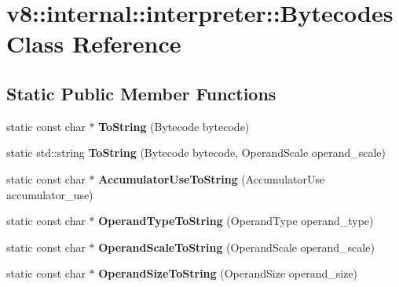 \hypertarget{classv8_1_1internal_1_1interpreter_1_1_bytecodes}{}\section{v8\+:\+:internal\+:\+:interpreter\+:\+:Bytecodes Class Reference}
\label{classv8_1_1internal_1_1interpreter_1_1_bytecodes}
\subsection*{Static Public Member Functions}
\begin{DoxyCompactItemize}
\item 
static const char $\ast$ {\bfseries To\+String} (Bytecode bytecode)\hypertarget{classv8_1_1internal_1_1interpreter_1_1_bytecodes_ae3e76b6c1aba4e2cfafd4c53594607ba}{}\label{classv8_1_1internal_1_1interpreter_1_1_bytecodes_ae3e76b6c1aba4e2cfafd4c53594607ba}

\item 
static std\+::string {\bfseries To\+String} (Bytecode bytecode, Operand\+Scale operand\+\_\+scale)\hypertarget{classv8_1_1internal_1_1interpreter_1_1_bytecodes_a75ba05c4dc6f5023649248172e88e957}{}\label{classv8_1_1internal_1_1interpreter_1_1_bytecodes_a75ba05c4dc6f5023649248172e88e957}

\item 
static const char $\ast$ {\bfseries Accumulator\+Use\+To\+String} (Accumulator\+Use accumulator\+\_\+use)\hypertarget{classv8_1_1internal_1_1interpreter_1_1_bytecodes_abf683ecca883b8e6ba727bf92b236e06}{}\label{classv8_1_1internal_1_1interpreter_1_1_bytecodes_abf683ecca883b8e6ba727bf92b236e06}

\item 
static const char $\ast$ {\bfseries Operand\+Type\+To\+String} (Operand\+Type operand\+\_\+type)\hypertarget{classv8_1_1internal_1_1interpreter_1_1_bytecodes_a610a033ef1e65b6d8d2e1332c4e8d617}{}\label{classv8_1_1internal_1_1interpreter_1_1_bytecodes_a610a033ef1e65b6d8d2e1332c4e8d617}

\item 
static const char $\ast$ {\bfseries Operand\+Scale\+To\+String} (Operand\+Scale operand\+\_\+scale)\hypertarget{classv8_1_1internal_1_1interpreter_1_1_bytecodes_a3975bcf830c14d38c66336fbc7fdcfec}{}\label{classv8_1_1internal_1_1interpreter_1_1_bytecodes_a3975bcf830c14d38c66336fbc7fdcfec}

\item 
static const char $\ast$ {\bfseries Operand\+Size\+To\+String} (Operand\+Size operand\+\_\+size)\hypertarget{classv8_1_1internal_1_1interpreter_1_1_bytecodes_aa3c64b32a0d6fc12c793d03a1bd142d8}{}\label{classv8_1_1internal_1_1interpreter_1_1_bytecodes_aa3c64b32a0d6fc12c793d03a1bd142d8}


\end{DoxyCompactItemize}
